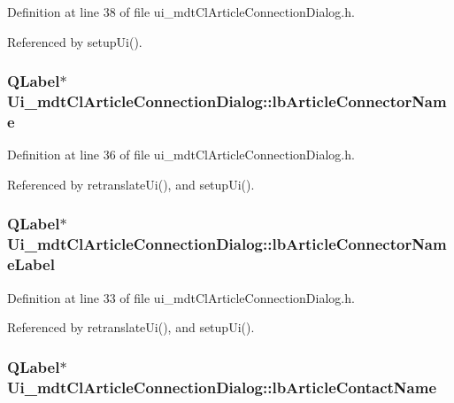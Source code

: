Definition at line 38 of file ui\-\_\-mdt\-Cl\-Article\-Connection\-Dialog.\-h.



Referenced by setup\-Ui().

\hypertarget{class_ui__mdt_cl_article_connection_dialog_aeed8bbddc15fd018b49c56b0b52620ef}{
\subsubsection[{lb\-Article\-Connector\-Name}]{\setlength{\rightskip}{0pt plus 5cm}Q\-Label$\ast$ Ui\-\_\-mdt\-Cl\-Article\-Connection\-Dialog\-::lb\-Article\-Connector\-Name}}\label{class_ui__mdt_cl_article_connection_dialog_aeed8bbddc15fd018b49c56b0b52620ef}


Definition at line 36 of file ui\-\_\-mdt\-Cl\-Article\-Connection\-Dialog.\-h.



Referenced by retranslate\-Ui(), and setup\-Ui().

\hypertarget{class_ui__mdt_cl_article_connection_dialog_a0ae659538ae53bcd35d807183e6aad0d}{
\subsubsection[{lb\-Article\-Connector\-Name\-Label}]{\setlength{\rightskip}{0pt plus 5cm}Q\-Label$\ast$ Ui\-\_\-mdt\-Cl\-Article\-Connection\-Dialog\-::lb\-Article\-Connector\-Name\-Label}}\label{class_ui__mdt_cl_article_connection_dialog_a0ae659538ae53bcd35d807183e6aad0d}


Definition at line 33 of file ui\-\_\-mdt\-Cl\-Article\-Connection\-Dialog.\-h.



Referenced by retranslate\-Ui(), and setup\-Ui().

\hypertarget{class_ui__mdt_cl_article_connection_dialog_a25772986f5e1ad1c6d1e80c9fcba13ee}{
\subsubsection[{lb\-Article\-Contact\-Name}]{\setlength{\rightskip}{0pt plus 5cm}Q\-Label$\ast$ Ui\-\_\-mdt\-Cl\-Article\-Connection\-Dialog\-::lb\-Article\-Contact\-Name}}\label{class_ui__mdt_cl_article_connection_dialog_a25772986f5e1ad1c6d1e80c9fcba13ee}


